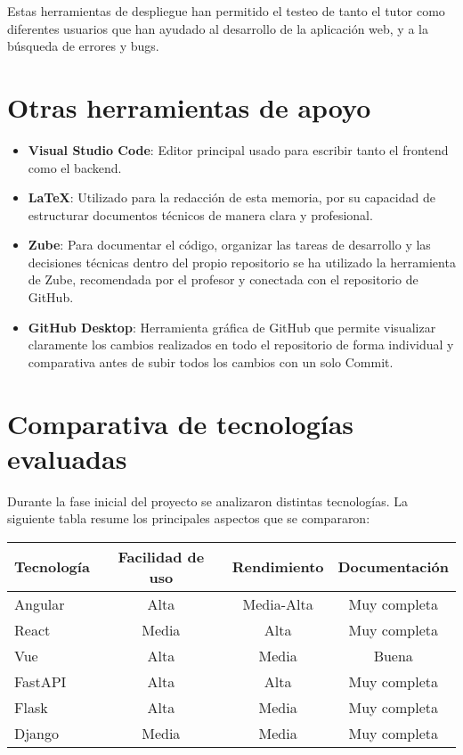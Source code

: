 Estas herramientas de despliegue han permitido el testeo de tanto el tutor como diferentes usuarios que han ayudado al desarrollo de la aplicación web, y a la búsqueda de errores y bugs.

\section{Otras herramientas de apoyo}

\begin{itemize}
  \item \textbf{Visual Studio Code}: Editor principal usado para escribir tanto el frontend como el backend.
  \item \textbf{LaTeX}: Utilizado para la redacción de esta memoria, por su capacidad de estructurar documentos técnicos de manera clara y profesional.
  \item \textbf{Zube}: Para documentar el código, organizar las tareas de desarrollo y las decisiones técnicas dentro del propio repositorio se ha utilizado la herramienta de Zube, recomendada por el profesor y conectada con el repositorio de GitHub.
  \item \textbf{GitHub Desktop}: Herramienta gráfica de GitHub que permite visualizar claramente los cambios realizados en todo el repositorio de forma individual y comparativa antes de subir todos los cambios con un solo Commit.
  
\end{itemize}

\section{Comparativa de tecnologías evaluadas}

Durante la fase inicial del proyecto se analizaron distintas tecnologías. La siguiente tabla resume los principales aspectos que se compararon:

\begin{center}
\begin{tabular}{|l|c|c|c|}
\hline
\textbf{Tecnología} & \textbf{Facilidad de uso} & \textbf{Rendimiento} & \textbf{Documentación} \\
\hline
Angular & Alta & Media-Alta & Muy completa \\
React & Media & Alta & Muy completa \\
Vue & Alta & Media & Buena \\
FastAPI & Alta & Alta & Muy completa \\
Flask & Alta & Media & Muy completa \\
Django & Media & Media & Muy completa \\
\hline
\end{tabular}
\end{center}

